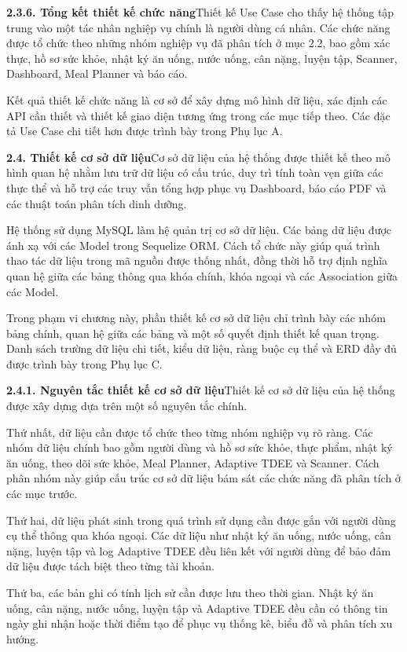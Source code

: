 \textbf{2.3.6. Tổng kết thiết kế chức năng}Thiết kế Use Case cho thấy hệ thống tập trung vào một tác nhân nghiệp vụ chính là người dùng cá nhân. Các chức năng được tổ chức theo những nhóm nghiệp vụ đã phân tích ở mục 2.2, bao gồm xác thực, hồ sơ sức khỏe, nhật ký ăn uống, nước uống, cân nặng, luyện tập, Scanner, Dashboard, Meal Planner và báo cáo.

Kết quả thiết kế chức năng là cơ sở để xây dựng mô hình dữ liệu, xác định các API cần thiết và thiết kế giao diện tương ứng trong các mục tiếp theo. Các đặc tả Use Case chi tiết hơn được trình bày trong Phụ lục A.

\textbf{2.4. Thiết kế cơ sở dữ liệu}Cơ sở dữ liệu của hệ thống được thiết kế theo mô hình quan hệ nhằm lưu trữ dữ liệu có cấu trúc, duy trì tính toàn vẹn giữa các thực thể và hỗ trợ các truy vấn tổng hợp phục vụ Dashboard, báo cáo PDF và các thuật toán phân tích dinh dưỡng.

Hệ thống sử dụng MySQL làm hệ quản trị cơ sở dữ liệu. Các bảng dữ liệu được ánh xạ với các Model trong Sequelize ORM. Cách tổ chức này giúp quá trình thao tác dữ liệu trong mã nguồn được thống nhất, đồng thời hỗ trợ định nghĩa quan hệ giữa các bảng thông qua khóa chính, khóa ngoại và các Association giữa các Model.

Trong phạm vi chương này, phần thiết kế cơ sở dữ liệu chỉ trình bày các nhóm bảng chính, quan hệ giữa các bảng và một số quyết định thiết kế quan trọng. Danh sách trường dữ liệu chi tiết, kiểu dữ liệu, ràng buộc cụ thể và ERD đầy đủ được trình bày trong Phụ lục C.

\textbf{2.4.1. Nguyên tắc thiết kế cơ sở dữ liệu}Thiết kế cơ sở dữ liệu của hệ thống được xây dựng dựa trên một số nguyên tắc chính.

Thứ nhất, dữ liệu cần được tổ chức theo từng nhóm nghiệp vụ rõ ràng. Các nhóm dữ liệu chính bao gồm người dùng và hồ sơ sức khỏe, thực phẩm, nhật ký ăn uống, theo dõi sức khỏe, Meal Planner, Adaptive TDEE và Scanner. Cách phân nhóm này giúp cấu trúc cơ sở dữ liệu bám sát các chức năng đã phân tích ở các mục trước.

Thứ hai, dữ liệu phát sinh trong quá trình sử dụng cần được gắn với người dùng cụ thể thông qua khóa ngoại. Các dữ liệu như nhật ký ăn uống, nước uống, cân nặng, luyện tập và log Adaptive TDEE đều liên kết với người dùng để bảo đảm dữ liệu được tách biệt theo từng tài khoản.

Thứ ba, các bản ghi có tính lịch sử cần được lưu theo thời gian. Nhật ký ăn uống, cân nặng, nước uống, luyện tập và Adaptive TDEE đều cần có thông tin ngày ghi nhận hoặc thời điểm tạo để phục vụ thống kê, biểu đồ và phân tích xu hướng.

